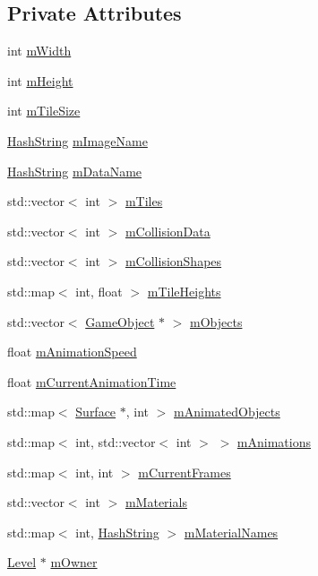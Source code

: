\subsection*{Private Attributes}
\begin{DoxyCompactItemize}
\item 
int \hyperlink{classTileMapGenerator_a5465fd60f8897f7a6f9347091a20db85}{m\+Width}
\item 
int \hyperlink{classTileMapGenerator_ad6448a870a8488d8c061691fb50e48f4}{m\+Height}
\item 
int \hyperlink{classTileMapGenerator_a1283774e574f8cad65f5655ed44f2f58}{m\+Tile\+Size}
\item 
\hyperlink{classHashString}{Hash\+String} \hyperlink{classTileMapGenerator_aa311820f47d30ecb2a149309056f7fe1}{m\+Image\+Name}
\item 
\hyperlink{classHashString}{Hash\+String} \hyperlink{classTileMapGenerator_a404e5ae457f83dddc3f1885db1977492}{m\+Data\+Name}
\item 
std\+::vector$<$ int $>$ \hyperlink{classTileMapGenerator_a56f5a8a73968d218f891c06550caeacf}{m\+Tiles}
\item 
std\+::vector$<$ int $>$ \hyperlink{classTileMapGenerator_aa5ba592e33617b95ea1b5b0c9cde8f58}{m\+Collision\+Data}
\item 
std\+::vector$<$ int $>$ \hyperlink{classTileMapGenerator_a19c6cd2094aecea6b5023d5d4b6b7f06}{m\+Collision\+Shapes}
\item 
std\+::map$<$ int, float $>$ \hyperlink{classTileMapGenerator_a3c87011be2473b781ce74334f44e22da}{m\+Tile\+Heights}
\item 
std\+::vector$<$ \hyperlink{classGameObject}{Game\+Object} $\ast$ $>$ \hyperlink{classTileMapGenerator_aa2fcfe47a8ec1df8efcc6c70fa9569f8}{m\+Objects}
\item 
float \hyperlink{classTileMapGenerator_a825f78b3c667def795a56a9f588a201f}{m\+Animation\+Speed}
\item 
float \hyperlink{classTileMapGenerator_a71ee0ca8d20adcf3a3ed90dab02eac28}{m\+Current\+Animation\+Time}
\item 
std\+::map$<$ \hyperlink{classSurface}{Surface} $\ast$, int $>$ \hyperlink{classTileMapGenerator_ab0d06a6840abf94e7da908865e9f6417}{m\+Animated\+Objects}
\item 
std\+::map$<$ int, std\+::vector$<$ int $>$ $>$ \hyperlink{classTileMapGenerator_af4a5352a6da40e73dca83bd61438c5eb}{m\+Animations}
\item 
std\+::map$<$ int, int $>$ \hyperlink{classTileMapGenerator_a13df3ece1e27582b842f6add478b941a}{m\+Current\+Frames}
\item 
std\+::vector$<$ int $>$ \hyperlink{classTileMapGenerator_a6a696d8c2baf1e9eadb7c7332b8a2933}{m\+Materials}
\item 
std\+::map$<$ int, \hyperlink{classHashString}{Hash\+String} $>$ \hyperlink{classTileMapGenerator_aba5484cd0ce2eeecc413ba6d81d3352b}{m\+Material\+Names}
\item 
\hyperlink{classLevel}{Level} $\ast$ \hyperlink{classTileMapGenerator_a4f7e2e7890f7ad6ed8ec47390e7bb192}{m\+Owner}
\end{DoxyCompactItemize}


